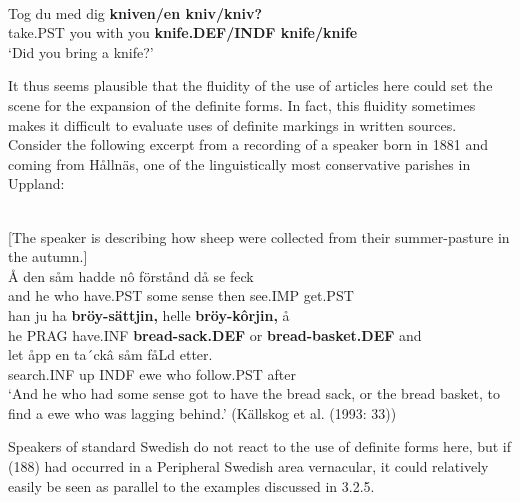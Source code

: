 
\ea \label{} 
\\
\gll Tog  du  med  dig  \textbf{kniven/en kniv/kniv?}\\
take.PST  you  with  you  \textbf{knife.DEF/INDF knife/knife}\\
\glt ‘Did you bring a knife?’

\z

It thus seems plausible that the fluidity of the use of articles here could set the scene for the expansion of the definite forms. In fact, this fluidity sometimes makes it difficult to evaluate uses of definite markings in written sources. Consider the following excerpt from a recording of a speaker born in 1881 and coming from Hållnäs, one of the linguistically most conservative parishes in Uppland:


\ea \label{} 
\\
{}[The speaker is describing how sheep were collected from their summer-pasture in the autumn.]\\
\gll 	Å  den  såm  hadde  nô  förstånd  då  se  feck\\
		and  he  who  have.PST  some  sense  then  see.IMP  get.PST\\
\gll 	han  ju  ha  \textbf{bröy-sättjin,} helle  \textbf{bröy-kôrjin,} å\\
		he  PRAG  have.INF  \textbf{bread-sack.DEF} or  \textbf{bread-basket.DEF} and\\
\gll 	le{\textasciigrave}t  åpp  en  ta´ckâ  såm  fåLd  etter.\\
		search.INF  up  INDF  ewe  who  follow.PST  after\\
\glt  ‘And he who had some sense got to have the bread sack, or the bread basket, to find a ewe who was lagging behind.’ (Källskog et al. (1993: 33))

\z

Speakers of standard Swedish do not react to the use of definite forms here, but if (188) had occurred in a Peripheral Swedish area vernacular, it could relatively easily be seen as parallel to the examples discussed in 3.2.5.


